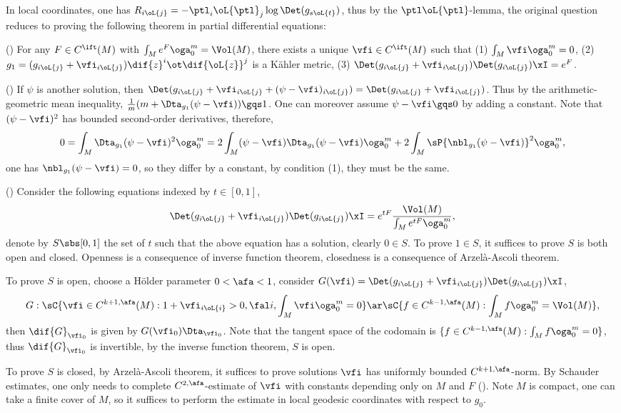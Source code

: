 \documentclass[a4paper, twoside]{article}
\begin{document}
\begin{prf}
	In local coordinates, one has $R_{i\oL{j}}=-\ptl_{i}\oL{\ptl}_{j}\log\Det(g_{s\oL{t}})$, thus by the $\ptl\oL{\ptl}$-lemma, the original question reduces to proving the following theorem in partial differential equations:

	(\cite[Theorem~1]{Yau1978}) For any $F\in C^{\ift}(M)$ with $\int_{M}e^{F}\oga_{0}^{m}=\Vol(M)$, there exists a unique $\vfi\in C^{\ift}(M)$ such that (1) $\int_{M}\vfi\oga_{0}^{m}=0$, (2) $g_{1}=(g_{i\oL{j}}+\vfi_{i\oL{j}})\dif{z}^{i}\ot\dif{\oL{z}}^{j}$ is a K{\"a}hler metric, (3) $\Det(g_{i\oL{j}}+\vfi_{i\oL{j}})\Det(g_{i\oL{j}})\xI=e^{F}$.

	 (\cite[Page~375]{Yau1978}) If $\psi$ is another solution, then $\Det(g_{i\oL{j}}+\vfi_{i\oL{j}}+(\psi-\vfi)_{i\oL{j}})=\Det(g_{i\oL{j}}+\vfi_{i\oL{j}})$. Thus by the arithmetic-geometric mean inequality, $\frac{1}{m}(m+\Dta_{g_{1}}(\psi-\vfi))\gqs1$. One can moreover assume $\psi-\vfi\gqs0$ by adding a constant. Note that $(\psi-\vfi)^{2}$ has bounded second-order derivatives, therefore,
		\[
			0=\int_{M}\Dta_{g_{1}}(\psi-\vfi)^{2}\oga_{0}^{m}=2\int_{M}(\psi-\vfi)\Dta_{g_{1}}(\psi-\vfi)\oga_{0}^{m}+2\int_{M}\sP{\nbl_{g_{1}}(\psi-\vfi)}^{2}\oga_{0}^{m},
		\]
	one has $\nbl_{g_{1}}(\psi-\vfi)=0$, so they differ by a constant, by condition (1), they must be the same.



	 (\cite[Page~361]{Yau1978}) Consider the following equations indexed by $t\in[0,1]$,
	\[
		\Det(g_{i\oL{j}}+\vfi_{i\oL{j}})\Det(g_{i\oL{j}})\xI=e^{tF}\frac{\Vol(M)}{\int_{M}e^{tF}\oga_{0}^{m}},
	\]
	denote by $S\sbs[0,1]$ the set of $t$ such that the above equation has a solution, clearly $0\in S$. To prove $1\in S$, it suffices to prove $S$ is both open and closed. Openness is a consequence of inverse function theorem, closedness is a consequence of Arzel{\`a}-Ascoli theorem.
	\begin{enr}[label = (\arabic*)]
		\item To prove $S$ is open, choose a H{\"o}lder parameter $0<\afa<1$, consider $G(\vfi)=\Det(g_{i\oL{j}}+\vfi_{i\oL{j}})\Det(g_{i\oL{j}})\xI$,
		\[
			G:\sC{\vfi\in C^{k+1,\afa}(M):1+\vfi_{i\oL{i}}>0,\fal i, \int_{M}\vfi\oga_{0}^{m}=0}\ar \sC{f\in C^{k-1,\afa}(M):\int_{M}f\oga_{0}^{m}=\Vol(M)},
		\]
		then $\dif{G}_{\vfi_{0}}$ is given by $G(\vfi_{0})\Dta_{\vfi_{0}}$. Note that the tangent space of the codomain is $\{f\in C^{k-1,\afa}(M):\int_{M}f\oga_{0}^{m}=0\}$, thus $\dif{G}_{\vfi_{0}}$ is invertible, by the inverse function theorem, $S$ is open.
		\item To prove $S$ is closed, by Arzel{\`a}-Ascoli theorem, it suffices to prove solutions $\vfi$ has uniformly bounded $C^{k+1,\afa}$-norm. By Schauder estimates, one only needs to complete $C^{2,\afa}$-estimate of $\vfi$ with constants depending only on $M$ and $F$ (\cite[Proposion~2.1, Proposition~3.1]{Yau1978}). Note $M$ is compact, one can take a finite cover of $M$, so it suffices to perform the estimate in local geodesic coordinates with respect to $g_{0}$.


\end{enr}
\end{prf}
\end{document}

